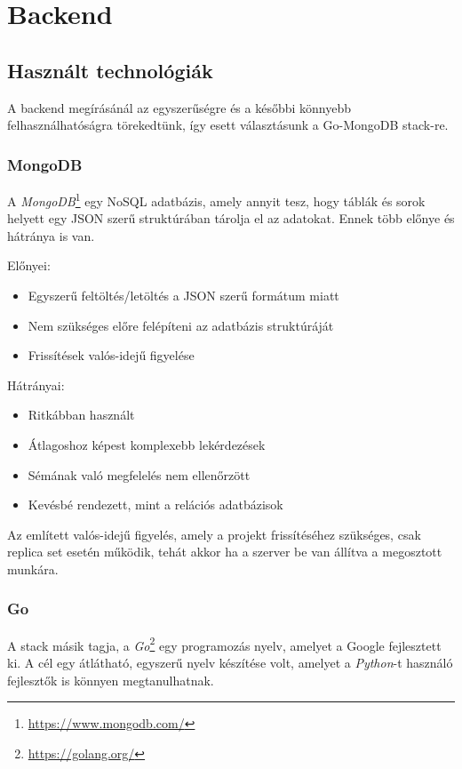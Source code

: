 \section{Backend}
\subsection{Használt technológiák}
A backend megírásánál az egyszerűségre és a későbbi könnyebb felhasználhatóságra törekedtünk, így esett választásunk a Go-MongoDB stack-re.
\subsubsection{MongoDB}
A \emph{MongoDB}\footnote{\url{https://www.mongodb.com/}} egy NoSQL adatbázis, amely annyit tesz, hogy táblák és sorok helyett egy JSON szerű struktúrában tárolja el az adatokat.
Ennek több előnye és hátránya is van.

\begin{samepage}
\noindent Előnyei:
\begin{itemize}
    \item Egyszerű feltöltés/letöltés a JSON szerű formátum miatt
    \item Nem szükséges előre felépíteni az adatbázis struktúráját
    \item Frissítések valós-idejű figyelése
\end{itemize}

\noindent Hátrányai:
\begin{itemize}
    \item Ritkábban használt
    \item Átlagoshoz képest komplexebb lekérdezések
    \item Sémának való megfelelés nem ellenőrzött
    \item Kevésbé rendezett, mint a relációs adatbázisok
\end{itemize}
\end{samepage}

Az említett valós-idejű figyelés, amely a projekt frissítéséhez szükséges, csak replica set esetén működik, tehát akkor ha a szerver be van állítva a megosztott munkára.
\subsubsection{Go}
A stack másik tagja, a \emph{Go}\footnote{\url{https://golang.org/}} egy programozás nyelv, amelyet a Google fejlesztett ki. A cél egy átlátható, egyszerű nyelv készítése volt, amelyet a \emph{Python}-t használó fejlesztők is könnyen megtanulhatnak. 

